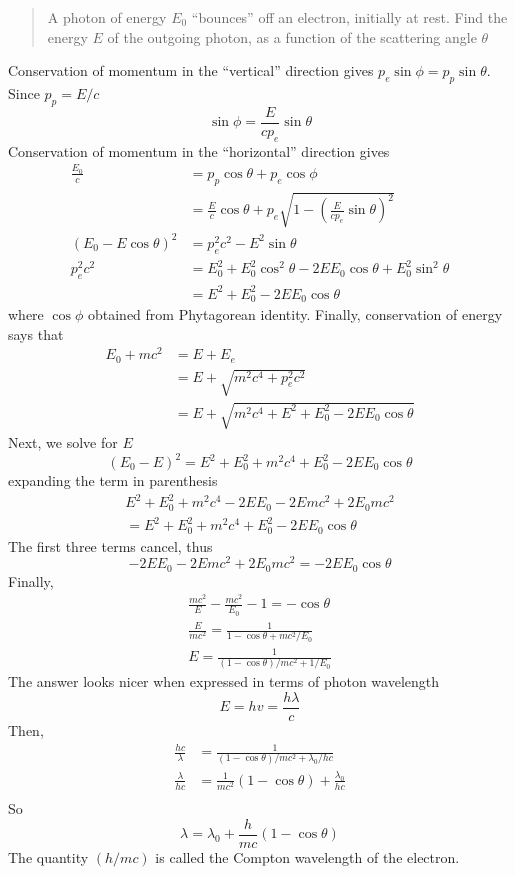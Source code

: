 \documentclass[../main.tex]{subfiles}
\begin{document}
\begin{quote}
    A photon of energy $E_0$ “bounces” off an electron, initially at rest. Find the energy $E$ of the outgoing photon, as a function of the scattering angle $\theta$ 
\end{quote}
Conservation of momentum in the “vertical” direction gives $p_e \sin \phi = p_p \sin \theta$. Since $p_p = E/c$
\begin{equation*}
    \sin \phi=\frac{E}{c p_e}\sin \theta
\end{equation*}
Conservation of momentum in the “horizontal” direction gives
\begin{align*}
    \frac{E_0}{c}&=p_p \cos \theta + p_e \cos \phi\\
    &=\frac{E}{c}\cos \theta+ p_e \sqrt{1-(\frac{E}{c p_e}\sin \theta)^2}\\
    (E_0-E\cos\theta)^2&=p_e^2c^2-E^2\sin\theta\\
    p_e^2c^2&=E_0^2+E_0^2\cos^2\theta-2EE_0\cos\theta+E_0^2\sin^2\theta\\
    &=E^2+E_0^2-2EE_0\cos\theta
\end{align*}
where $ \cos \phi$ obtained from Phytagorean identity. Finally, conservation of energy says that
\begin{align*}
    E_0 + mc^2& = E + E_e \\
    &=E+ \sqrt{m^2c^4 + p^2_e c^2}\\
    &=E+ \sqrt{m^2c^4 + E^2+E_0^2-2EE_0\cos\theta}
\end{align*}
Next, we solve for $E$
\begin{equation*}
    (E_0-E)^2=E^2 + E_0^2 + m^2c^4 +E_0^2-2EE_0\cos\theta
\end{equation*}
expanding the term in parenthesis
\begin{multline*}
    E^2 + E_0^2 + m^2c^4 - 2EE_0-2Emc^2 + 2E_0mc^2\\=E^2 + E_0^2 + m^2c^4 +E_0^2-2EE_0\cos\theta
\end{multline*}
The first three terms cancel, thus
\begin{equation*}
    - 2EE_0-2Emc^2 + 2E_0mc^2=-2EE_0\cos\theta
\end{equation*}
Finally,
\begin{align*}
    \frac{mc^2}{E}-\frac{mc^2}{E_0}-1=-\cos\theta\\
    \frac{E}{mc^2}=\frac{1}{1-\cos\theta+mc^2/E_0}\\
    E=\frac{1}{(1-\cos\theta)/mc^2+1/E_0}
\end{align*}
The answer looks nicer when expressed in terms of photon wavelength
\begin{equation*}
    E=hv=\frac{h\lambda}{c}
\end{equation*}
Then,
\begin{align*}
    \frac{hc}{\lambda}&=\frac{1}{(1-\cos\theta)/mc^2+\lambda_0/hc}\\
    \frac{\lambda}{hc}&=\frac{1}{mc^2}(1-\cos\theta)+\frac{\lambda_0}{hc}\\
\end{align*}
So
\begin{equation*}
    \lambda=\lambda_0+\frac{h}{mc}(1-\cos\theta)
\end{equation*}
The quantity $ (h/mc)$ is called the Compton wavelength of the electron. 
\end{document}
